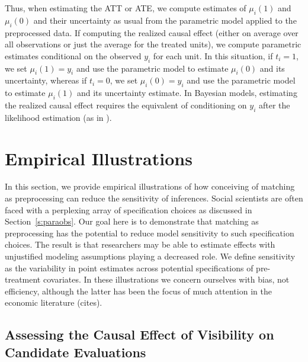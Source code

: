 \documentclass[11pt,titlepage]{article}
\begin{document}
Thus, when estimating the ATT or ATE, we compute estimates of
$\mu_i(1)$ and $\mu_i(0)$ and their uncertainty as usual from the
parametric model applied to the preprocessed data.  If computing the
realized causal effect (either on average over all observations or
just the average for the treated units), we compute parametric
estimates conditional on the observed $y_i$ for each unit.  In this
situation, if $t_i=1$, we set $\mu_i(1)=y_i$ and use the parametric
model to estimate $\mu_i(0)$ and its uncertainty, whereas if $t_i=0$,
we set $\mu_i(0)=y_i$ and use the parametric model to estimate
$\mu_i(1)$ and its uncertainty estimate.  In Bayesian models,
estimating the realized causal effect requires the equivalent of
conditioning on $y_i$ after the likelihood estimation (as in
\citet{King97}).

\section{Empirical Illustrations}

In this section, we provide empirical illustrations of how conceiving
of matching as preprocessing can reduce the sensitivity of inferences.
Social scientists are often faced with a perplexing array of
specification choices as discussed in Section~\ref{s:paraobs}.  Our
goal here is to demonstrate that matching as preprocessing has the
potential to reduce model sensitivity to such specification choices.
The result is that researchers may be able to estimate effects with
unjustified modeling assumptions playing a decreased role.  We define
sensitivity as the variability in point estimates across potential
specifications of pre-treatment covariates.  In these illustrations we
concern ourselves with bias, not efficiency, although the latter has
been the focus of much attention in the economic literature (cites). 

\subsection{Assessing the Causal Effect of Visibility on Candidate
  Evaluations}
\end{document}
